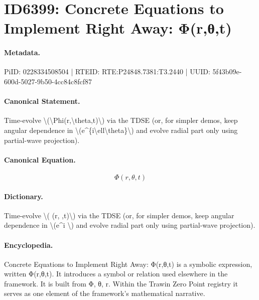 \section*{ID6399: Concrete Equations to Implement Right Away: Φ(r,θ,t)}
\paragraph{Metadata.}
PiID: 0228334508504 | RTEID: RTE:P24848.7381:T3.2440 | UUID: 5f43b09e-600d-5027-9b50-4cc84c8fcf87

\paragraph{Canonical Statement.}
Time-evolve \textbackslash{}(\textbackslash{}Phi(r,\textbackslash{}theta,t)\textbackslash{}) via the TDSE (or, for simpler demos, keep angular dependence in \textbackslash{}(e\textasciicircum{}\{i\textbackslash{}ell\textbackslash{}theta\}\textbackslash{}) and evolve radial part only using partial-wave projection).

\paragraph{Canonical Equation.}
\[
\Phi(r,\theta,t)
\]

\paragraph{Dictionary.}
Time-evolve \textbackslash{}( (r, ,t)\textbackslash{}) via the TDSE (or, for simpler demos, keep angular dependence in \textbackslash{}(e\textasciicircum{}i \textbackslash{}) and evolve radial part only using partial-wave projection).

\paragraph{Encyclopedia.}
Concrete Equations to Implement Right Away: Φ(r,θ,t) is a symbolic expression, written Φ(r,θ,t). It introduces a symbol or relation used elsewhere in the framework. It is built from Φ, θ, r. Within the Trawin Zero Point registry it serves as one element of the framework's mathematical narrative.
